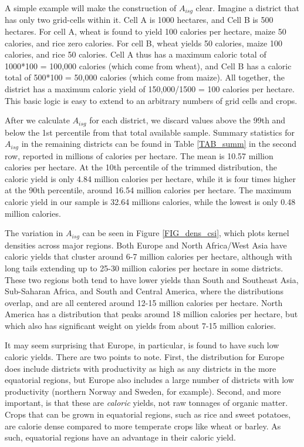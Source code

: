 \documentclass[11pt]{article}
\begin{document}
A simple example will make the construction of $A_{isg}$ clear. Imagine a district that has only two grid-cells within it. Cell A is 1000 hectares, and Cell B is 500 hectares. For cell A, wheat is found to yield 100 calories per hectare, maize 50 calories, and rice zero calories. For cell B, wheat yields 50 calories, maize 100 calories, and rice 50 calories. Cell A thus has a maximum caloric total of 1000*100 = 100,000 calories (which come from wheat), and Cell B has a caloric total of 500*100 = 50,000 calories (which come from maize). All together, the district has a maximum caloric yield of 150,000/1500 = 100 calories per hectare. This basic logic is easy to extend to an arbitrary numbers of grid cells and crops.

After we calculate $A_{isg}$ for each district, we discard values above the 99th and below the 1st percentile from that total available sample. Summary statistics for $A_{isg}$ in the remaining districts can be found in Table \ref{TAB_summ} in the second row, reported in millions of calories per hectare. The mean is 10.57 million calories per hectare. At the 10th percentile of the trimmed distribution, the caloric yield is only 4.84 million calories per hectare, while it is four times higher at the 90th percentile, around 16.54 million calories per hectare. The maximum caloric yield in our sample is 32.64 millions calories, while the lowest is only 0.48 million calories. 

The variation in $A_{isg}$ can be seen in Figure \ref{FIG_dens_csi}, which plots kernel densities across major regions. Both Europe and North Africa/West Asia have caloric yields that cluster around 6-7 million calories per hectare, although with long tails extending up to 25-30 million calories per hectare in some districts. These two regions both tend to have lower yields than South and Southeast Asia, Sub-Saharan Africa, and South and Central America, where the distributions overlap, and are all centered around 12-15 million calories per hectare. North America has a distribution that peaks around 18 million calories per hectare, but which also has significant weight on yields from about 7-15 million calories. 

It may seem surprising that Europe, in particular, is found to have such low caloric yields. There are two points to note. First, the distribution for Europe does include districts with productivity as high as any districts in the more equatorial regions, but Europe also includes a large number of districts with low productivity (northern Norway and Sweden, for example). Second, and more important, is that these are \textit{caloric} yields, not raw tonnages of organic matter. Crops that can be grown in equatorial regions, such as rice and sweet potatoes, are calorie dense compared to more temperate crops like wheat or barley. As such, equatorial regions have an advantage in their caloric yield. 
\end{document}
